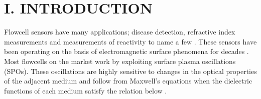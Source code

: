 \selectfont
{}
\section*{I. INTRODUCTION}
\begin{flushleft}
	\hspace{0.25in}
	Flowcell sensors have many applications; disease detection, refractive index measurements and measurements of reactivity to name a few \cite{homola1999surface}. These sensors have been operating on the basis of electromagnetic surface phenomena for decades \cite{homola1999surface}. Most flowcells on the market work by exploiting surface plasma oscillations (SPOs). These oscillations are highly sensitive to changes in the optical properties of the adjacent medium and follow from Maxwell's equations when the dielectric functions of each medium satisfy the relation below \cite{JLTROB:1,JACKSONEM, griffiths2005introduction}.


\end{flushleft}
